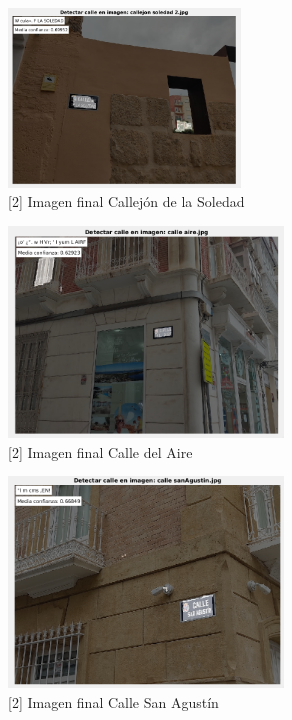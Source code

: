 \documentclass[12pt]{article}
\begin{document}
	\begin{figure}[h!]
		\begin{center}
			\includegraphics[width=0.55\textwidth]{img/2_2.png}
			\caption{[2] Imagen final Callejón de la Soledad}
		\end{center}
	\end{figure}
	
	\pagebreak
	
	\begin{figure}[h!]
		\begin{center}
			\includegraphics[width=0.65\textwidth]{img/2_3.png}
			\caption{[2] Imagen final Calle del Aire}
		\end{center}
	\end{figure}
	
	\begin{figure}[h!]
		\begin{center}
			\includegraphics[width=0.65\textwidth]{img/2_4.png}
			\caption{[2] Imagen final Calle San Agustín}
		\end{center}
	\end{figure}
	
\end{document}
